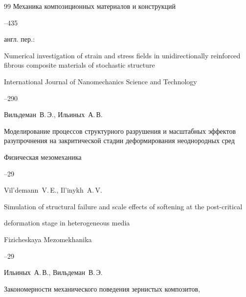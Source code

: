 \begin{thebibliography}{99}
\jour Механика композиционных материалов и конструкций




--435

\transl англ. пер.:~

\paper Numerical investigation of strain and stress fields in unidirectionally reinforced fibrous composite materials of stochastic structure 

\jour International Journal of Nanomechanics Science and Technology




--290







\by Вильдеман~В.\,Э., Ильиных~А.\,В.

\paper Моделирование процессов структурного разрушения и масштабных  эффектов разупрочнения на закритической стадии деформирования неоднородных сред

\jour Физическая мезомеханика




--29

\misctransl

\by Vil'demann~V.\,E., Il'inykh~A.\,V. 

\paper Simulation of structural failure and scale effects of softening at the post-critical

deformation stage in heterogeneous media

\jour Fizicheskaya Mezomekhanika




--29






\by Ильиных~А.\,В., Вильдеман~В.\,Э.

\paper Закономерности механического поведения зернистых композитов,


\end{thebibliography}
